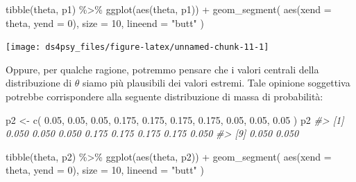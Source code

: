 \documentclass[
  11pt,
]{krantz}
\makeatletter
\newenvironment{Shaded}{\begin{snugshade}}{\end{snugshade}}
\newcommand{\AttributeTok}[1]{\textcolor[rgb]{0.61,0.61,0.61}{#1}}
\newcommand{\CommentTok}[1]{\textcolor[rgb]{0.37,0.37,0.37}{\textit{#1}}}
\newcommand{\DecValTok}[1]{\textcolor[rgb]{0.06,0.06,0.06}{#1}}
\newcommand{\FloatTok}[1]{\textcolor[rgb]{0.06,0.06,0.06}{#1}}
\newcommand{\FunctionTok}[1]{\textcolor[rgb]{0,0,0}{#1}}
\newcommand{\NormalTok}[1]{#1}
\newcommand{\OtherTok}[1]{\textcolor[rgb]{0.37,0.37,0.37}{#1}}
\newcommand{\SpecialCharTok}[1]{\textcolor[rgb]{0,0,0}{#1}}
\newcommand{\StringTok}[1]{\textcolor[rgb]{0.5,0.5,0.5}{#1}}
\newenvironment{kframe}{%
\medskip{}
\setlength{\fboxsep}{.8em}
 \def\at@end@of@kframe{}%
 \ifinner\ifhmode%
  \def\at@end@of@kframe{\end{minipage}}%
  \begin{minipage}{\columnwidth}%
 \fi\fi%
 \def\FrameCommand##1{\hskip\@totalleftmargin \hskip-\fboxsep
 \colorbox{shadecolor}{##1}\hskip-\fboxsep
     \hskip-\linewidth \hskip-\@totalleftmargin \hskip\columnwidth}%
 \MakeFramed {\advance\hsize-\width
   \@totalleftmargin\z@ \linewidth\hsize
   \@setminipage}}%
 {\par\unskip\endMakeFramed%
 \at@end@of@kframe}
\renewenvironment{Shaded}{\begin{kframe}}{\end{kframe}}
\theoremstyle{definition}
\theoremstyle{definition}
\theoremstyle{definition}
\theoremstyle{definition}
\theoremstyle{remark}
\makeatother
\begin{document}
\begin{Shaded}
\begin{Highlighting}[]
\FunctionTok{tibble}\NormalTok{(theta, p1) }\SpecialCharTok{\%\textgreater{}\%}
  \FunctionTok{ggplot}\NormalTok{(}\FunctionTok{aes}\NormalTok{(theta, p1)) }\SpecialCharTok{+}
  \FunctionTok{geom\_segment}\NormalTok{(}
    \FunctionTok{aes}\NormalTok{(}\AttributeTok{xend =}\NormalTok{ theta, }\AttributeTok{yend =} \DecValTok{0}\NormalTok{),}
    \AttributeTok{size =} \DecValTok{10}\NormalTok{, }\AttributeTok{lineend =} \StringTok{"butt"}
\NormalTok{  )}
\end{Highlighting}
\end{Shaded}

\begin{center}\texttt{[image: ds4psy\_files/figure-latex/unnamed-chunk-11-1]} \end{center}

Oppure, per qualche ragione, potremmo pensare che i valori centrali della distribuzione di \(\theta\) siamo più plausibili dei valori estremi. Tale opinione soggettiva potrebbe corrispondere alla seguente distribuzione di massa di probabilità:

\begin{Shaded}
\begin{Highlighting}[]
\NormalTok{p2 }\OtherTok{\textless{}{-}} \FunctionTok{c}\NormalTok{(}
  \FloatTok{0.05}\NormalTok{, }\FloatTok{0.05}\NormalTok{, }\FloatTok{0.05}\NormalTok{, }\FloatTok{0.175}\NormalTok{, }\FloatTok{0.175}\NormalTok{, }\FloatTok{0.175}\NormalTok{, }\FloatTok{0.175}\NormalTok{, }\FloatTok{0.05}\NormalTok{, }\FloatTok{0.05}\NormalTok{, }\FloatTok{0.05}
\NormalTok{)}
\NormalTok{p2}
\CommentTok{\#\textgreater{}  [1] 0.050 0.050 0.050 0.175 0.175 0.175 0.175 0.050}
\CommentTok{\#\textgreater{}  [9] 0.050 0.050}
\end{Highlighting}
\end{Shaded}

\begin{Shaded}
\begin{Highlighting}[]
\FunctionTok{tibble}\NormalTok{(theta, p2) }\SpecialCharTok{\%\textgreater{}\%}
  \FunctionTok{ggplot}\NormalTok{(}\FunctionTok{aes}\NormalTok{(theta, p2)) }\SpecialCharTok{+}
  \FunctionTok{geom\_segment}\NormalTok{(}
    \FunctionTok{aes}\NormalTok{(}\AttributeTok{xend =}\NormalTok{ theta, }\AttributeTok{yend =} \DecValTok{0}\NormalTok{),}
    \AttributeTok{size =} \DecValTok{10}\NormalTok{, }\AttributeTok{lineend =} \StringTok{"butt"}
\NormalTok{  )}
\end{Highlighting}
\end{Shaded}
\end{document}
